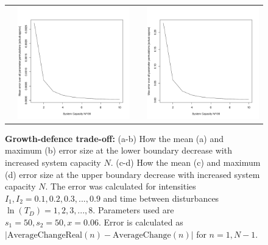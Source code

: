\begin{figure}[th]
\begin{tabular}{rrrr}
  &\includegraphics[width=2.5in]{GDtmeanerr.pdf} && \includegraphics[width=2.5in]{GDtmaxerr.pdf} \end{tabular}
   \caption{\textbf{Growth-defence trade-off:} (a-b)  How the mean (a) and maximum (b)  error size at the lower boundary decrease with increased system capacity $N$. (c-d) How the mean (c) and maximum (d) error size at the upper boundary decrease with increased system capacity $N$. The error was calculated for intensities $I_1,I_2=0.1,0.2,0.3,...,0.9$ and time between disturbances $\ln(T_D)=1,2,3,...,8.$ Parameters used are $s_1=50,s_2=50,x=0.06$. Error is calculated as $| \text{AverageChangeReal}(n) - \text{AverageChange}(n) |$ for $n=1,N-1$.}
     \label{fig:growthdefenceerrors}
    \end{figure}
    
